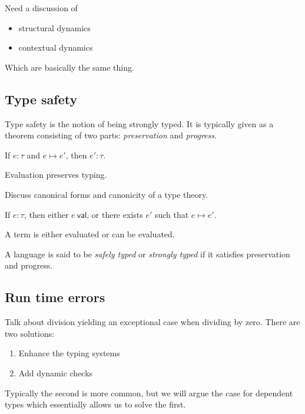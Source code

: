 Need a discussion of

\begin{itemize}
    \item structural dynamics
    \item contextual dynamics
\end{itemize}

Which are basically the same thing.

\subsection{Type safety}

Type safety is the notion of being strongly typed. It is typically given as a theorem consisting of two parts: \emph{preservation} and \emph{progress}.

\begin{defin}[Preservation]
    If $e : \tau$ and $e \mapsto e'$, then $e' : \tau$.
\end{defin}

Evaluation preserves typing.

Discuss canonical forms and canonicity of a type theory.

\begin{defin}[Progress]
    If $e : \tau$, then either $e\ \mathsf{val}$, or there exists $e'$ such that $e \mapsto e'$.
\end{defin}

A term is either evaluated or can be evaluated.

\begin{defin}
    A language is said to be \emph{safely typed} or \emph{strongly typed} if it satisfies preservation and progress.
\end{defin}

\subsection{Run time errors}

Talk about division yielding an exceptional case when dividing by zero. There are two solutions:

\begin{enumerate}
    \item Enhance the typing systems
    \item Add dynamic checks
\end{enumerate}

Typically the second is more common, but we will argue the case for dependent types which essentially allows us to solve the first.

